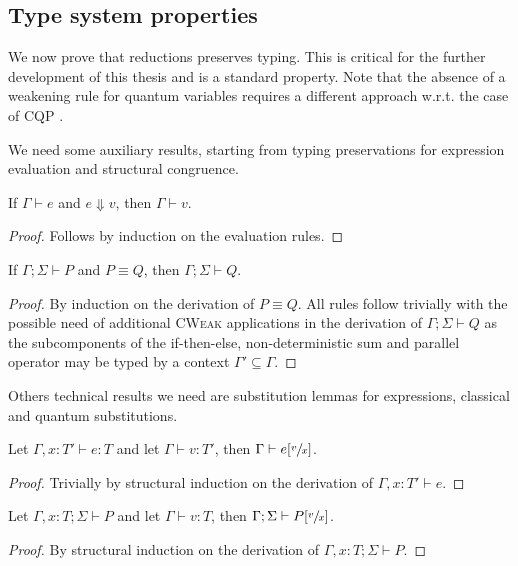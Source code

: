\subsection{Type system properties}

We now prove that reductions preserves typing. This is critical for the further development of this thesis and is a standard property. Note that the absence of a weakening rule for quantum variables requires a different approach w.r.t. the case of CQP \cite{gayCommunicatingQuantumProcesses2005}.

We need some auxiliary results, starting from typing preservations for expression evaluation and structural congruence.
 
\begin{theorem}\label{thm:eval_typing}
  If $\Gamma \vdash e$ and $e \Downarrow v$, then $\Gamma \vdash v$.
\end{theorem}
\begin{proof}
  Follows by induction on the evaluation rules.
\end{proof}

\begin{theorem}
  If $\Gamma; \Sigma \vdash P$ and $P \equiv Q$, then $\Gamma; \Sigma \vdash Q$.
\end{theorem}
\begin{proof}
  By induction on the derivation of $P \equiv Q$. All rules follow trivially with the possible need of additional \textsc{CWeak} applications in the derivation
  of $\Gamma; \Sigma \vdash Q$ as the subcomponents of the if-then-else, non-deterministic sum and parallel operator may be typed by a context $\Gamma' \subseteq \Gamma$.
\end{proof}

Others technical results we need are substitution lemmas for expressions, classical and quantum substitutions.

\begin{lemma}
  Let $\Gamma, x : T' \vdash e : T$ and let $\Gamma \vdash v : T'$, then $\Gamma \vdash e[\sfrac{v}{x}]$.
\end{lemma}
\begin{proof}
  Trivially by structural induction on the derivation of $\Gamma, x : T' \vdash e$.
\end{proof}

\begin{theorem}
  Let $\Gamma, x : T; \Sigma \vdash P$ and let $\Gamma \vdash v : T$, then $\Gamma; \Sigma \vdash P[\sfrac{v}{x}]$.
\end{theorem}
\begin{proof}
  By structural induction on the derivation of $\Gamma, x : T; \Sigma \vdash P$.
\end{proof}

